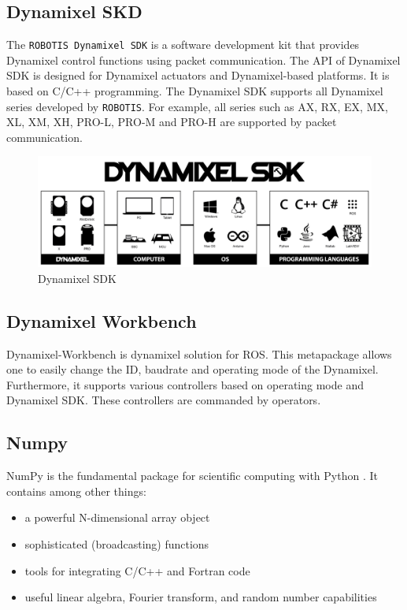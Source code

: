 \subsection{Dynamixel SKD}
The \texttt{ROBOTIS Dynamixel SDK} is a software development kit that provides Dynamixel control functions using packet communication. The API of Dynamixel SDK is designed for Dynamixel actuators and Dynamixel-based platforms. It is based on C/C++ programming. The Dynamixel SDK supports all Dynamixel series developed by \texttt{ROBOTIS}. For example, all series such as AX, RX, EX, MX, XL, XM, XH, PRO-L, PRO-M and PRO-H are supported by packet communication.
\begin{figure}
	\centering
	\includegraphics[width=\textwidth]{img/sdk.jpg}%
	\caption{Dynamixel SDK}
	\label{fig:turretPipeline}
\end{figure}

\subsection{Dynamixel Workbench}
Dynamixel-Workbench is dynamixel solution for ROS. This metapackage allows one to easily change the ID, baudrate and operating mode of the Dynamixel. Furthermore, it supports various controllers based on operating mode and Dynamixel SDK. These controllers are commanded by operators.


\subsection{Numpy}
NumPy is the fundamental package for scientific computing with Python \cite{numpy}. It contains among other things:
\begin{itemize}
    \item a powerful N-dimensional array object
    \item sophisticated (broadcasting) functions
    \item tools for integrating C/C++ and Fortran code
    \item useful linear algebra, Fourier transform, and random number capabilities
\end{itemize}

